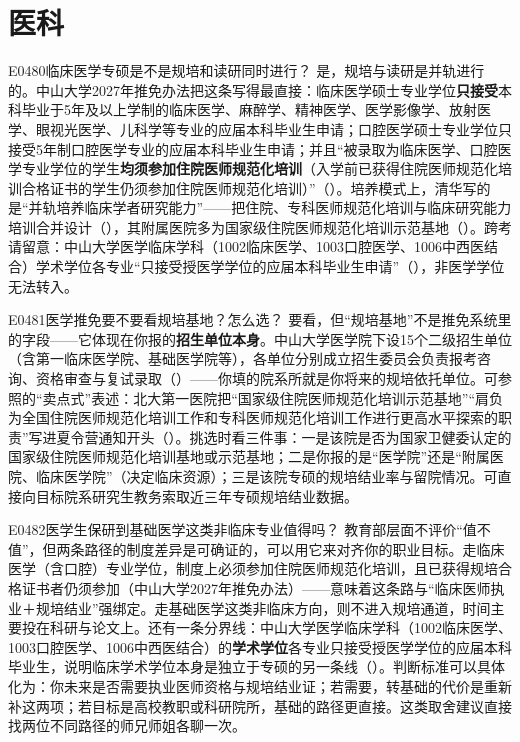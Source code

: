 \section{医科}
\begin{qa}{E0480}{临床医学专硕是不是规培和读研同时进行？}
是，规培与读研是并轨进行的。中山大学2027年推免办法把这条写得最直接：临床医学硕士专业学位\textbf{只接受}本科毕业于5年及以上学制的临床医学、麻醉学、精神医学、医学影像学、放射医学、眼视光医学、儿科学等专业的应届本科毕业生申请；口腔医学硕士专业学位只接受5年制口腔医学专业的应届本科毕业生申请；并且“被录取为临床医学、口腔医学专业学位的学生\textbf{均须参加住院医师规范化培训}（入学前已获得住院医师规范化培训合格证书的学生仍须参加住院医师规范化培训）”（）。培养模式上，清华写的是“并轨培养临床学者研究能力”——把住院、专科医师规范化培训与临床研究能力培训合并设计（），其附属医院多为国家级住院医师规范化培训示范基地（）。跨考请留意：中山大学医学临床学科（1002临床医学、1003口腔医学、1006中西医结合）学术学位各专业“只接受授医学学位的应届本科毕业生申请”（），非医学学位无法转入。
\end{qa}

\begin{qa}{E0481}{医学推免要不要看规培基地？怎么选？}
要看，但“规培基地”不是推免系统里的字段——它体现在你报的\textbf{招生单位本身}。中山大学医学院下设15个二级招生单位（含第一临床医学院、基础医学院等），各单位分别成立招生委员会负责报考咨询、资格审查与复试录取（）——你填的院系所就是你将来的规培依托单位。可参照的“卖点式”表述：北大第一医院把“国家级住院医师规范化培训示范基地”“肩负为全国住院医师规范化培训工作和专科医师规范化培训工作进行更高水平探索的职责”写进夏令营通知开头（）。挑选时看三件事：一是该院是否为国家卫健委认定的国家级住院医师规范化培训基地或示范基地；二是你报的是“医学院”还是“附属医院、临床医学院”（决定临床资源）；三是该院专硕的规培结业率与留院情况。可直接向目标院系研究生教务索取近三年专硕规培结业数据。
\end{qa}

\begin{qa}{E0482}{医学生保研到基础医学这类非临床专业值得吗？}
教育部层面不评价“值不值”，但两条路径的制度差异是可确证的，可以用它来对齐你的职业目标。走临床医学（含口腔）专业学位，制度上必须参加住院医师规范化培训，且已获得规培合格证书者仍须参加（中山大学2027年推免办法）——意味着这条路与“临床医师执业＋规培结业”强绑定。走基础医学这类非临床方向，则不进入规培通道，时间主要投在科研与论文上。还有一条分界线：中山大学医学临床学科（1002临床医学、1003口腔医学、1006中西医结合）的\textbf{学术学位}各专业只接受授医学学位的应届本科毕业生，说明临床学术学位本身是独立于专硕的另一条线（）。判断标准可以具体化为：你未来是否需要执业医师资格与规培结业证；若需要，转基础的代价是重新补这两项；若目标是高校教职或科研院所，基础的路径更直接。这类取舍建议直接找两位不同路径的师兄师姐各聊一次。
\end{qa}

